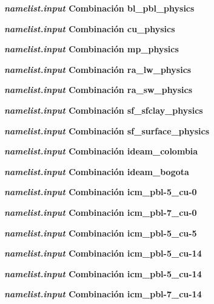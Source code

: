 \textbf{\textit{namelist.input}  Combinación bl\_pbl\_physics}



\textbf{\textit{namelist.input}  Combinación cu\_physics}



\textbf{\textit{namelist.input}  Combinación mp\_physics}



\textbf{\textit{namelist.input}  Combinación ra\_lw\_physics}



\textbf{\textit{namelist.input}  Combinación ra\_sw\_physics}



\textbf{\textit{namelist.input}  Combinación sf\_sfclay\_physics}



\textbf{\textit{namelist.input}  Combinación sf\_surface\_physics}



\textbf{\textit{namelist.input}  Combinación ideam\_colombia}



\textbf{\textit{namelist.input}  Combinación ideam\_bogota}



\textbf{\textit{namelist.input}  Combinación icm\_pbl-5\_cu-0}



\textbf{\textit{namelist.input}  Combinación icm\_pbl-7\_cu-0}



\textbf{\textit{namelist.input}  Combinación icm\_pbl-5\_cu-5}



\textbf{\textit{namelist.input}  Combinación icm\_pbl-5\_cu-14}



\textbf{\textit{namelist.input}  Combinación icm\_pbl-5\_cu-14}



\textbf{\textit{namelist.input}  Combinación icm\_pbl-7\_cu-14}

